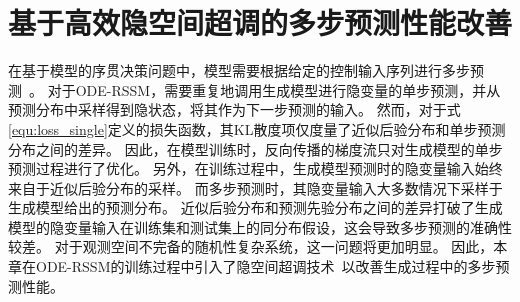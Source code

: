 \section{基于高效隐空间超调的多步预测性能改善}
\label{sec:5_overshooting}
在基于模型的序贯决策问题中，模型需要根据给定的控制输入序列进行多步预测~\cite{Hafner2019}。
对于ODE-RSSM，需要重复地调用生成模型进行隐变量的单步预测，并从预测分布中采样得到隐状态，将其作为下一步预测的输入。
然而，对于式\eqref{equ:loss_single}定义的损失函数，其KL散度项仅度量了近似后验分布和单步预测分布之间的差异。
因此，在模型训练时，反向传播的梯度流只对生成模型的单步预测过程进行了优化。
另外，在训练过程中，生成模型预测时的隐变量输入始终来自于近似后验分布的采样。
而多步预测时，其隐变量输入大多数情况下采样于生成模型给出的预测分布。
近似后验分布和预测先验分布之间的差异打破了生成模型的隐变量输入在训练集和测试集上的同分布假设，这会导致多步预测的准确性较差\cite{venkatraman2015improving}。
对于观测空间不完备的随机性复杂系统，这一问题将更加明显。
因此，本章在ODE-RSSM的训练过程中引入了隐空间超调技术~\cite{Hafner2019}以改善生成过程中的多步预测性能。

